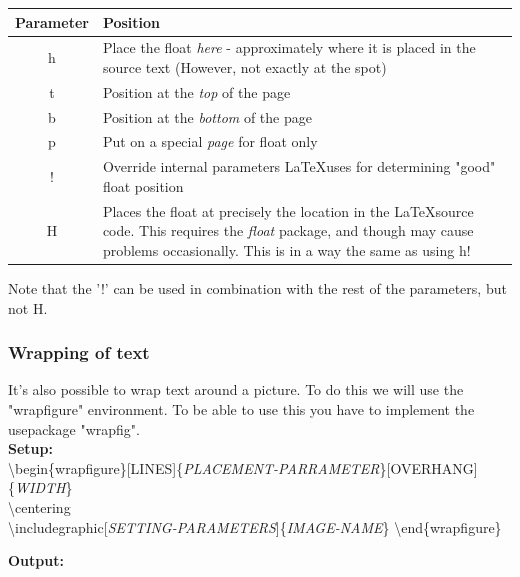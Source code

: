 \documentclass{article}
\newcommand{\jbs}[1]{\textbackslash{}#1} %
\begin{document}
\begin{table}[h]
    \centering
    \begin{tabular}{|c|p{5in}|} \hline
        \rowcolor{gray!30}
        Parameter & Position \\ \hline
        h & Place the float \textit{here} - approximately where it is placed in the source text (However, not exactly at the spot) \\ \hline
        t & Position at the \textit{top} of the page \\ \hline
        b & Position at the \textit{bottom} of the page \\ \hline
        p & Put on a special \textit{page} for float only \\ \hline
        ! & Override internal parameters \LaTeX uses for determining "good" float position \\ \hline
        H & Places the float at precisely the location in the \LaTeX source code. This requires the \textit{float} package,
        and though may cause problems occasionally. This is in a way the same as using h! \\ \hline
    \end{tabular}
\end{table} %

Note that the '!' can be used in combination with the rest of the parameters, but not H.

\subsubsection{Wrapping of text} \label{secc:image_wrapping}
It's also possible to wrap text around a picture. To do this we will use the "wrapfigure" environment. 
To be able to use this you have to implement the usepackage "wrapfig". \\



\vspace{0.75em}
{\large\textbf{Setup:}} \\
\jbs{begin\{wrapfigure\}[LINES]\{\textit{PLACEMENT-PARRAMETER}\}[OVERHANG]\{\textit{WIDTH}\}} \\
    \jbs{centering} \\
    \jbs{includegraphic[\textit{SETTING-PARAMETERS}]\{\textit{IMAGE-NAME}\}}
\jbs{end\{wrapfigure\}} \\


\vspace{1.25em}

{\large\textbf{Output:}}
\end{document}
